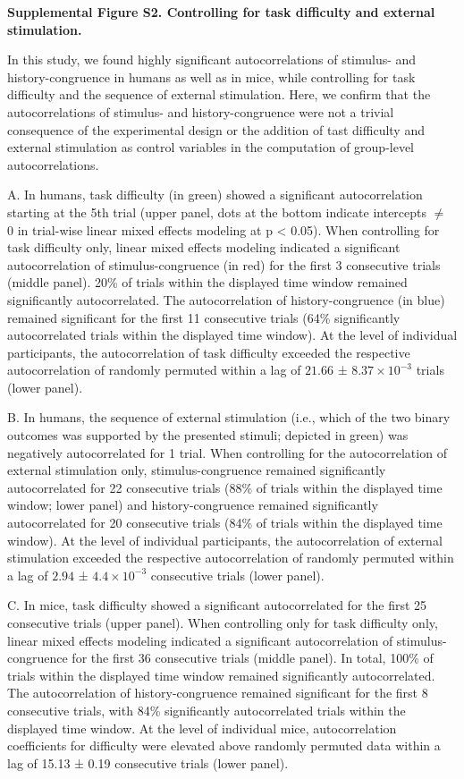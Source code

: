 \documentclass[
]{article}
\begin{document}
\textbf{Supplemental Figure S2. Controlling for task difficulty and
external stimulation.}

In this study, we found highly significant autocorrelations of stimulus-
and history-congruence in humans as well as in mice, while controlling
for task difficulty and the sequence of external stimulation. Here, we
confirm that the autocorrelations of stimulus- and history-congruence
were not a trivial consequence of the experimental design or the
addition of tast difficulty and external stimulation as control
variables in the computation of group-level autocorrelations.

A. In humans, task difficulty (in green) showed a significant
autocorrelation starting at the 5th trial (upper panel, dots at the
bottom indicate intercepts \(\neq\) 0 in trial-wise linear mixed effects
modeling at p \textless{} 0.05). When controlling for task difficulty
only, linear mixed effects modeling indicated a significant
autocorrelation of stimulus-congruence (in red) for the first 3
consecutive trials (middle panel). 20\% of trials within the displayed
time window remained significantly autocorrelated. The autocorrelation
of history-congruence (in blue) remained significant for the first 11
consecutive trials (64\% significantly autocorrelated trials within the
displayed time window). At the level of individual participants, the
autocorrelation of task difficulty exceeded the respective
autocorrelation of randomly permuted within a lag of \(21.66\) ±
\(\ensuremath{8.37\times 10^{-3}}\) trials (lower panel).

B. In humans, the sequence of external stimulation (i.e., which of the
two binary outcomes was supported by the presented stimuli; depicted in
green) was negatively autocorrelated for 1 trial. When controlling for
the autocorrelation of external stimulation only, stimulus-congruence
remained significantly autocorrelated for 22 consecutive trials (88\% of
trials within the displayed time window; lower panel) and
history-congruence remained significantly autocorrelated for 20
consecutive trials (84\% of trials within the displayed time window). At
the level of individual participants, the autocorrelation of external
stimulation exceeded the respective autocorrelation of randomly permuted
within a lag of \(2.94\) ± \(\ensuremath{4.4\times 10^{-3}}\)
consecutive trials (lower panel).

C. In mice, task difficulty showed a significant autocorrelated for the
first 25 consecutive trials (upper panel). When controlling only for
task difficulty only, linear mixed effects modeling indicated a
significant autocorrelation of stimulus-congruence for the first 36
consecutive trials (middle panel). In total, 100\% of trials within the
displayed time window remained significantly autocorrelated. The
autocorrelation of history-congruence remained significant for the first
8 consecutive trials, with 84\% significantly autocorrelated trials
within the displayed time window. At the level of individual mice,
autocorrelation coefficients for difficulty were elevated above randomly
permuted data within a lag of 15.13 ± 0.19 consecutive trials (lower
panel).
\end{document}
